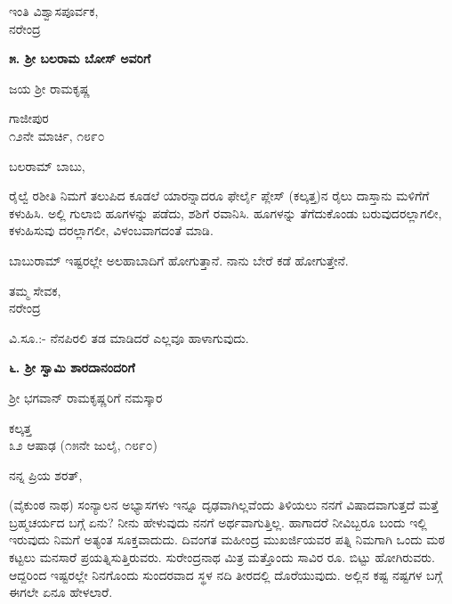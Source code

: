 \begin{flushright}
ಇಂತಿ ವಿಶ್ವಾಸಪೂರ್ವಕ,\\ನರೇಂದ್ರ
\end{flushright}

\begin{center}
\textbf{೫. ಶ‍್ರೀ ಬಲರಾಮ ಬೋಸ್ ಅವರಿಗೆ}
\end{center}

\begin{center}
ಜಯ ಶ‍್ರೀ ರಾಮಕೃಷ್ಣ
\end{center}

\begin{flushright}
ಗಾಜೀಪುರ\\೧೨ನೇ ಮಾರ್ಚಿ, ೧೮೯೦
\end{flushright}

ಬಲರಾಮ್​ ಬಾಬು,

ರೈಲ್ವೆ ರಶೀತಿ ನಿಮಗೆ ತಲುಪಿದ ಕೂಡಲೆ ಯಾರನ್ನಾದರೂ ಫೇರ್ಲೈ ಪ್ಲೇಸ್ (ಕಲ್ಕತ್ತ)ನ ರೈಲು ದಾಸ್ತಾನು ಮಳಿಗೆಗೆ ಕಳುಹಿಸಿ. ಅಲ್ಲಿ ಗುಲಾಬಿ ಹೂಗಳನ್ನು ಪಡೆದು, ಶಶಿಗೆ ರವಾನಿಸಿ. ಹೂಗಳನ್ನು ತೆಗೆದುಕೊಂಡು ಬರುವುದರಲ್ಲಾಗಲೀ, ಕಳುಹಿಸುವು ದರಲ್ಲಾಗಲೀ, ವಿಳಂಬವಾಗದಂತೆ ಮಾಡಿ.

ಬಾಬುರಾಮ್​ ಇಷ್ಟರಲ್ಲೇ ಅಲಹಾಬಾದಿಗೆ ಹೋಗುತ್ತಾನೆ. ನಾನು ಬೇರೆ ಕಡೆ ಹೋಗುತ್ತೇನೆ.

\begin{flushright}
ತಮ್ಮ ಸೇವಕ,\\ನರೇಂದ್ರ
\end{flushright}

{\small ವಿ.ಸೂ.:- ನೆನಪಿರಲಿ ತಡ ಮಾಡಿದರೆ ಎಲ್ಲವೂ ಹಾಳಾಗುವುದು.}

\begin{center}
\textbf{೬. ಶ‍್ರೀ ಸ್ವಾಮಿ ಶಾರದಾನಂದರಿಗೆ}
\end{center}

\begin{center}
ಶ‍್ರೀ ಭಗವಾನ್ ರಾಮಕೃಷ್ಣರಿಗೆ ನಮಸ್ಕಾರ
\end{center}

\begin{flushright}
ಕಲ್ಕತ್ತ\\೩೨ ಆಷಾಢ (೧೫ನೇ ಜುಲೈ, ೧೮೯೦)
\end{flushright}

ನನ್ನ ಪ್ರಿಯ ಶರತ್,

(ವೈಕುಂಠ ನಾಥ) ಸಂನ್ಯಾಲನ ಅಭ್ಯಾಸಗಳು ಇನ್ನೂ ದೃಢವಾಗಿಲ್ಲವೆಂದು ತಿಳಿಯಲು ನನಗೆ ವಿಷಾದವಾಗುತ್ತದೆ ಮತ್ತೆ ಬ್ರಹ್ಮಚರ್ಯದ ಬಗ್ಗೆ ಏನು? ನೀನು ಹೇಳುವುದು ನನಗೆ ಅರ್ಥವಾಗುತ್ತಿಲ್ಲ. ಹಾಗಾದರೆ ನೀವಿಬ್ಬರೂ ಬಂದು ಇಲ್ಲಿ ಇರುವುದು ನಿಮಗೆ ಅತ್ಯಂತ ಸೂಕ್ತವಾದುದು. ದಿವಂಗತ ಮಹೀಂದ್ರ ಮುಖರ್ಜಿಯವರ ಪತ್ನಿ ನಿಮಗಾಗಿ ಒಂದು ಮಠ ಕಟ್ಟಲು ಮನಸಾರೆ ಪ್ರಯತ್ನಿಸುತ್ತಿರುವರು. ಸುರೇಂದ್ರನಾಥ ಮಿತ್ರ ಮತ್ತೊಂದು ಸಾವಿರ ರೂ. ಬಿಟ್ಟು ಹೋಗಿರುವರು. ಆದ್ದರಿಂದ ಇಷ್ಟರಲ್ಲೇ ನಿನಗೊಂದು ಸುಂದರವಾದ ಸ್ಥಳ ನದಿ ತೀರದಲ್ಲಿ ದೊರೆಯುವುದು. ಅಲ್ಲಿನ ಕಷ್ಟ ನಷ್ಟಗಳ ಬಗ್ಗೆ ಈಗಲೇ ಏನೂ ಹೇಳಲಾರೆ.

